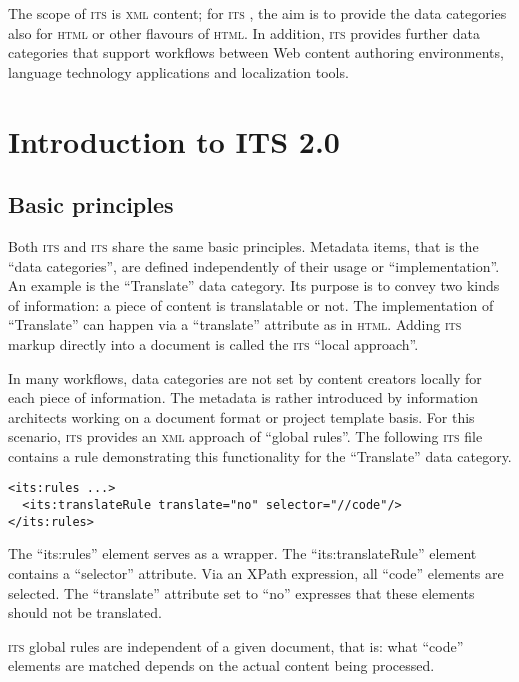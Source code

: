 \documentclass[output=paper]{LSP/langsci}
\begin{document}
The scope of \textsc{its } is \textsc{xml} content; for \textsc{its }, the aim is to provide the data categories also for \textsc{html} or other flavours of \textsc{html}. In addition, \textsc{its } provides further data categories that support workflows between Web content authoring environments, language technology applications and localization tools.

\section{Introduction to ITS 2.0}\label{sec:sasaki:3}
\subsection{Basic principles}\label{sec:sasaki:3.1}

Both \textsc{its } and \textsc{its } share the same basic principles. Metadata items, that is the ``data categories'', are defined independently of their usage or ``implementation''. An example is the ``Translate'' data category. Its purpose is to convey two kinds of information: a piece of content is translatable or not. The implementation of ``Translate'' can happen via a ``translate'' attribute as in \textsc{html}. Adding \textsc{its} markup directly into a document is called the \textsc{its} ``local approach''.

In many workflows, data categories are not set by content creators locally for each piece of information. The metadata is rather introduced by information architects working on a document format or project template basis. For this scenario, \textsc{its} provides an \textsc{xml} approach of ``global rules''. The following \textsc{its} file contains a rule demonstrating this functionality for the ``Translate'' data category.
 
\begin{lstlisting}
<its:rules ...>
  <its:translateRule translate="no" selector="//code"/>
</its:rules>
\end{lstlisting}

The ``its:rules'' element serves as a wrapper. The ``its:translateRule'' element contains a ``selector'' attribute. Via an XPath expression, all ``code'' elements are selected. The ``translate'' attribute set to ``no'' expresses that these elements should not be translated.

\textsc{its} global rules are independent of a given document, that is: what ``code'' elements are matched depends on the actual content being processed. 
\end{document}
